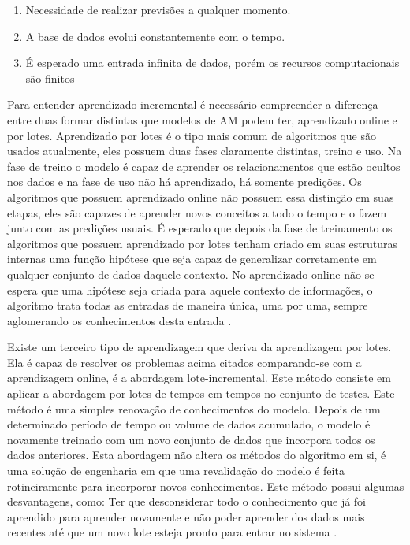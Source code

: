 \begin{enumerate}
\item Necessidade de realizar previsões a qualquer momento.
\item A base de dados evolui constantemente com o tempo.
\item É esperado uma entrada infinita de dados, porém os recursos computacionais são finitos
\end{enumerate}

Para entender aprendizado incremental é necessário compreender a diferença entre duas formar distintas que modelos de AM podem ter, aprendizado online e por lotes. Aprendizado por lotes é o tipo mais comum de algoritmos que são usados atualmente, eles possuem duas fases claramente distintas, treino e uso. Na fase de treino o modelo é capaz de aprender os relacionamentos que estão ocultos nos dados e na fase de uso não há aprendizado, há somente predições. Os algoritmos que possuem aprendizado online não possuem essa distinção em suas etapas, eles são capazes de aprender novos conceitos a todo o tempo e o fazem junto com as predições usuais. É esperado que depois da fase de treinamento os algoritmos que possuem aprendizado por lotes tenham criado em suas estruturas internas uma função hipótese que seja capaz de generalizar corretamente em qualquer conjunto de dados daquele contexto. No aprendizado online não se espera que uma hipótese seja criada para aquele contexto de informações, o algoritmo trata todas as entradas de maneira única, uma por uma, sempre aglomerando os conhecimentos desta entrada \cite{from2009}. 

Existe um terceiro tipo de aprendizagem que deriva da aprendizagem por lotes. Ela é capaz de resolver os problemas acima citados comparando-se com a aprendizagem online, é a abordagem lote-incremental. Este método consiste em aplicar a abordagem por lotes de tempos em tempos no conjunto de testes. Este método é uma simples renovação de conhecimentos do modelo. Depois de um determinado período de tempo ou volume de dados acumulado, o modelo é novamente treinado com um novo conjunto de dados que incorpora todos os dados anteriores. Esta abordagem não altera os métodos do algoritmo em si, é uma solução de engenharia em que uma revalidação do modelo é feita rotineiramente para incorporar novos conhecimentos. Este método possui algumas desvantagens, como: Ter que desconsiderar todo o conhecimento que já foi aprendido para aprender novamente e não poder aprender dos dados mais recentes até que um novo lote esteja pronto para entrar no sistema \cite{batch2013}.

